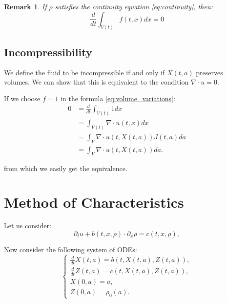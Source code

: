 \documentclass{article}
\theoremstyle{mystyle}
\theoremstyle{mystyleNormalFont}
\newtheorem{remark}[theorem]{Remark}
\theoremstyle{plain}
\begin{document}
\begin{remark}
    If $\rho$ satisfies the continuity equation \eqref{eq:continuity}, then:
    \[
        \frac{d}{dt} \int_{V(t)} f(t, x) dx = 0
    \]
\end{remark}

\subsection{Incompressibility}

We define the fluid to be incompressible if and only if $X(t, a)$ preserves volumes. We can show that this is equivalent to the condition $\nabla \cdot u = 0$.

If we choose $f=1$ in the formula \eqref{eq:volume_variations}:
\begin{equation}
    \label{eq:incompressibility}
    \begin{aligned}
        0 &= \frac{d}{dt} \int_{V(t)} 1 dx \\
        &= \int_{V(t)} \nabla \cdot u(t, x) dx \\
        &= \int_{V} \nabla \cdot u(t, X(t, a)) J(t, a) da \\
        &= \int_{V} \nabla \cdot u(t, X(t, a)) da.
    \end{aligned}
\end{equation}

from which we easily get the equivalence.


\section{Method of Characteristics}

Let us consider:
\begin{equation}
    \label{eq:char_1_dimension}
    \partial_t u + b(t, x, \rho) \cdot \partial_x \rho = c(t, x, \rho),
\end{equation}

Now consider the following system of ODEs:
\begin{equation}
    \begin{cases}
        \frac{d}{dt} X(t, a) = b(t, X(t, a), Z(t, a)), \\
        \frac{d}{dt} Z(t, a) = c(t, X(t, a), Z(t, a)), \\
        X(0, a) = a, \\
        Z(0, a) = \rho_0(a).
    \end{cases}
\end{equation}
\end{document}
